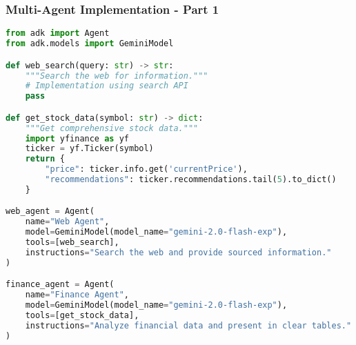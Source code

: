 \begin{frame}[fragile]\frametitle{Multi-Agent Implementation - Part 1}
      
      \begin{lstlisting}[language=python, basicstyle=\tiny]
from adk import Agent
from adk.models import GeminiModel

def web_search(query: str) -> str:
    """Search the web for information."""
    # Implementation using search API
    pass

def get_stock_data(symbol: str) -> dict:
    """Get comprehensive stock data."""
    import yfinance as yf
    ticker = yf.Ticker(symbol)
    return {
        "price": ticker.info.get('currentPrice'),
        "recommendations": ticker.recommendations.tail(5).to_dict()
    }

web_agent = Agent(
    name="Web Agent",
    model=GeminiModel(model_name="gemini-2.0-flash-exp"),
    tools=[web_search],
    instructions="Search the web and provide sourced information."
)

finance_agent = Agent(
    name="Finance Agent",
    model=GeminiModel(model_name="gemini-2.0-flash-exp"),
    tools=[get_stock_data],
    instructions="Analyze financial data and present in clear tables."
)
      \end{lstlisting}
\end{frame}

